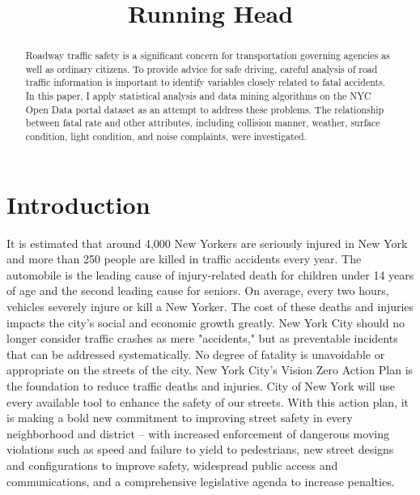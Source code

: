 \documentclass[conference]{IEEEtran}
\begin{document}
%
\title{Running Head}


\author{
}



\maketitle{}

\begin{abstract}
Roadway traffic safety is a significant concern for transportation governing agencies as well as ordinary citizens.  To provide advice for safe driving, careful analysis of road traffic information is important to identify variables closely related to fatal accidents.  In this paper, I apply statistical analysis and data mining algorithms on the NYC Open Data portal dataset as an attempt to address these problems. The relationship between fatal rate and other attributes, including collision manner, weather, surface condition, light condition, and noise complaints, were investigated.
\end{abstract}

\section{Introduction}
\label{sec:introduction}

It is estimated that around 4,000 New Yorkers are seriously injured in New York and more than 250 people are killed in traffic accidents every year. The automobile is the leading cause of injury-related death for children under 14 years of age and the second leading cause for seniors. On average, every two hours, vehicles severely injure or kill a New Yorker. The cost of these deaths and injuries impacts the city's social and economic growth greatly.  New York City should no longer consider traffic crashes as mere "accidents," but as preventable incidents that can be addressed systematically. No degree of fatality is unavoidable or appropriate on the streets of the city. New York City's Vision Zero Action Plan\cite{VisionZero} is the foundation to reduce traffic deaths and injuries. City of New York will use every available tool to enhance the safety of our streets. With this action plan, it is making a bold new commitment to improving street safety in every neighborhood and district – with increased enforcement of dangerous moving violations such as speed and failure to yield to pedestrians, new street designs and configurations to improve safety, widespread public access and communications, and a comprehensive legislative agenda to increase penalties. 
\end{document}
